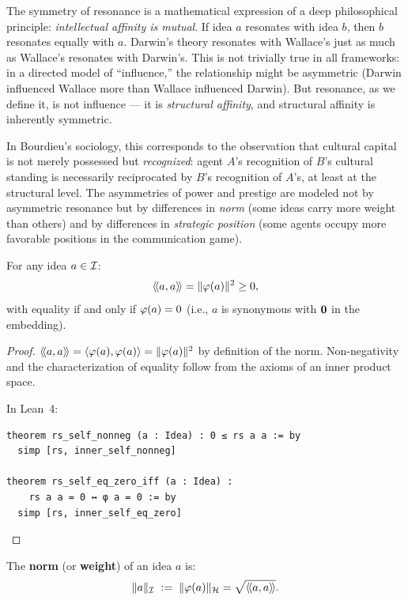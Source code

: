 \begin{interpretation}
\label{interp:mutuality}
The symmetry of resonance is a mathematical expression of a deep philosophical
principle: \emph{intellectual affinity is mutual}. If idea $a$ resonates with
idea $b$, then $b$ resonates equally with $a$. Darwin's theory resonates with
Wallace's just as much as Wallace's resonates with Darwin's. This is not
trivially true in all frameworks: in a directed model of ``influence,'' the
relationship might be asymmetric (Darwin influenced Wallace more than Wallace
influenced Darwin). But resonance, as we define it, is not influence --- it
is \emph{structural affinity}, and structural affinity is inherently symmetric.

In Bourdieu's sociology, this corresponds to the observation that cultural
capital is not merely possessed but \emph{recognized}: agent $A$'s recognition
of $B$'s cultural standing is necessarily reciprocated by $B$'s recognition of
$A$'s, at least at the structural level. The asymmetries of power and prestige
are modeled not by asymmetric resonance but by differences in \emph{norm} (some
ideas carry more weight than others) and by differences in \emph{strategic
position} (some agents occupy more favorable positions in the communication
game).
\end{interpretation}

\begin{theorem}
\label{thm:self-resonance}
For any idea $a \in \mathcal{I}$:
\[
  \langle\!\langle a, a \rangle\!\rangle = \lVert \varphi(a) \rVert^2 \geq 0,
\]
with equality if and only if $\varphi(a) = 0$ (i.e., $a$ is synonymous with
$\mathbf{0}$ in the embedding).
\end{theorem}

\begin{proof}
$\langle\!\langle a, a \rangle\!\rangle = \langle \varphi(a), \varphi(a) \rangle = \lVert \varphi(a) \rVert^2$ by definition of
the norm. Non-negativity and the characterization of equality follow from the
axioms of an inner product space.

In Lean~4:
\begin{lstlisting}
theorem rs_self_nonneg (a : Idea) : 0 ≤ rs a a := by
  simp [rs, inner_self_nonneg]

theorem rs_self_eq_zero_iff (a : Idea) :
    rs a a = 0 ↔ φ a = 0 := by
  simp [rs, inner_self_eq_zero]
\end{lstlisting}
\end{proof}

\begin{definition}
\label{def:idea-norm}
The \textbf{norm} (or \textbf{weight}) of an idea $a$ is:
\[
  \lVert a \rVert_{\mathcal{I}} \;:=\; \lVert \varphi(a) \rVert_{\mathcal{H}} = \sqrt{\langle\!\langle a, a \rangle\!\rangle}.
\]
\end{definition}

